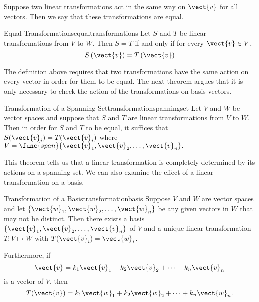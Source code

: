Suppose two linear transformations act in the same way on $\vect{v}$ for all vectors. Then we say that these transformations are equal.

\begin{definition}{Equal Transformations}{equaltransformations}
Let $S$ and $T$ be linear transformations from $V$ to $W$. Then $S = T$ if and only if for every $\vect{v} \in V$, 
\[
S \left( \vect{v} \right) = T \left( \vect{v} \right)
\]
\end{definition}

The definition above requires that two transformations have the same action on every vector in order for them to be equal. The next theorem argues that it is only necessary to check the action of the transformations on basis vectors.

\begin{theorem}{Transformation of a Spanning Set}{transformationspanningset}
Let $V$ and $W$ be vector spaces and suppose that $S$ and $T$ are linear transformations from $V$ to $W$. Then in order for $S$ and $T$ to be equal, it suffices that $S(\vect{v}_i) = T(\vect{v}_i)$ where $V=\func{span} \{ \vect{v}_1, \vect{v}_2, \ldots, \vect{v}_n\}.$
\end{theorem}

This theorem tells us that a linear transformation is completely
determined by its actions on a spanning set. We can also examine the effect of a linear transformation on a basis.

\begin{theorem}{Transformation of a Basis}{transformationbasis}
Suppose $V$ and $W$ are vector spaces and let $\{ \vect{w}_1, \vect{w}_2, \ldots, \vect{w}_n\}$ be any given vectors in $W$ that may not be distinct. Then there exists a basis $\{ \vect{v}_1, \vect{v}_2, \ldots, \vect{v}_n\}$ of $V$ and a unique linear transformation $T: V \mapsto W$ with $T (\vect{v}_i) = \vect{w}_i$.

Furthermore, if 
\[ \vect{v} = k_1\vect{v}_1+k_2\vect{v}_2+ \cdots+ k_n\vect{v}_n\]
is a vector of $V$, then
\[ T(\vect{v}) = k_1\vect{w}_1+k_2\vect{w}_2+ \cdots+ k_n\vect{w}_n.\]
\end{theorem}